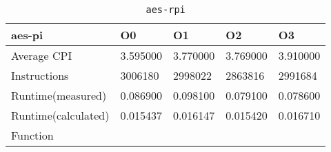 \begin{table}[ht!]
\centering
\caption{\texttt{aes-rpi}}
\label{tab:aes-rpi}
\begin{tabular}{|l|l|l|l|l|}
\hline
\textbf{aes-pi}	&	\textbf{O0}	&	\textbf{O1}	&	\textbf{O2}	&	\textbf{O3}	\\\hline\hline
Average CPI	&	3.595000	&	3.770000	&	3.769000	&	3.910000	\\\hline
Instructions	&	3006180	&	2998022	&	2863816	&	2991684	\\\hline
Runtime(measured)	&	0.086900	&	0.098100	&	0.079100	&	0.078600	\\\hline
Runtime(calculated)	&	0.015437	&	0.016147	&	0.015420	&	0.016710	\\\hline
Function	&		&		&		&		\\\hline
\end{tabular}
\end{table}

